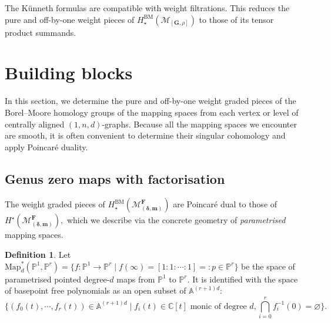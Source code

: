 \documentclass[12pt,reqno]{amsart}
\theoremstyle{definition}
\theoremstyle{definition}
\theoremstyle{definition}
\theoremstyle{definition}
\newtheorem{definition}[theorem]{Definition}
\begin{document}
The Künneth formulas are compatible with weight filtrations. This reduces the pure and off-by-one weight pieces of $H_\star^{\mathrm{BM}}(\mathcal{M}_{[\mathbf{G},\rho]})$ to those of its tensor product summands.

\section{Building blocks}\label{sec:build}
In this section, we determine the pure and off-by-one weight graded pieces of the Borel--Moore homology groups of the mapping spaces from each vertex or level of centrally aligned $(1,n,d)$-graphs. Because all the mapping spaces we encounter are smooth, it is often convenient to determine their singular cohomology and apply Poincaré duality.

\subsection{Genus zero maps with factorisation}\label{sec:gen0fac}
The weight graded pieces of $H_\star^{\mathrm{BM}}(\mathcal{M}^{\mathbf{F}}_{(\boldsymbol{\delta}, \boldsymbol{m})})$ are Poincaré dual to those of $H^\star(\mathcal{M}^{\mathbf{F}}_{(\boldsymbol{\delta}, \boldsymbol{m})}),$ which we describe via the concrete geometry of \emph{parametrised} mapping spaces.

\begin{definition}
  Let $\mathrm{Map}_{d}^{*}(\mathbb{P}^1, \mathbb{P}^r)=\{f: \mathbb{P}^1\to \mathbb{P}^r\mid f(\infty) = [1:1:\cdots:1]=:p\in \mathbb{P}^r\}$ be the space of parametrised pointed degree-$d$ maps from $\mathbb{P}^1$ to $\mathbb{P}^r.$ It is identified with the space of basepoint free polynomials as an open subset of $\mathbb{A}^{(r+1)d}$: $$\{(f_0(t),\cdots, f_r(t))\in \mathbb{A}^{(r+1)d}\mid f_i(t)\in \mathbb{C}[t]\text{ monic of degree }d, \bigcap_{i=0}^r f_i^{-1}(0) = \varnothing\}.$$ 
\end{definition}
\end{document}
